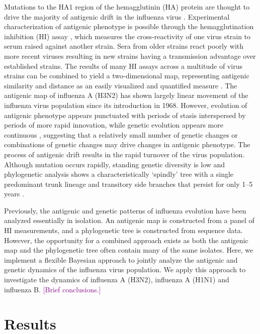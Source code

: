 \documentclass[11pt,oneside,letterpaper]{article}
\def\tbc#1{\textcolor{purple}{[#1]}}
\begin{document}
Mutations to the HA1 region of the hemagglutinin (HA) protein are thought to drive the majority of antigenic drift in the influenza virus \cite{Nelson07NatRevGenet}. 
Experimental characterization of antigenic phenotype is possible through the hemagglutination inhibition (HI) assay \cite{Hirst43}, which measures the cross-reactivity of one virus strain to serum raised against another strain. 
Sera from older strains react poorly with more recent viruses resulting in new strains having a transmission advantage over established strains. 
The results of many HI assays across a multitude of virus strains can be combined to yield a two-dimensional map, representing antigenic similarity and distance as an easily visualized and quantified measure \cite{Smith04}. 
The antigenic map of influenza A (H3N2) has shown largely linear movement of the influenza virus population since its introduction in 1968. However, evolution of antigenic phenotype appears punctuated with periods of stasis interspersed by periods of more rapid innovation, while genetic evolution appears more continuous \cite{Smith04}, suggesting that a relatively small number of genetic changes or combinations of genetic changes may drive changes in antigenic phenotype. 
The process of antigenic drift results in the rapid turnover of the virus population. 
Although mutation occurs rapidly, standing genetic diversity is low and phylogenetic analysis shows a characteristically `spindly' tree with a single predominant trunk lineage and transitory side branches that persist for only 1--5 years \cite{Fitch97}.

Previously, the antigenic and genetic patterns of influenza evolution have been analyzed essentially in isolation. 
An antigenic map is constructed from a panel of HI measurements, and a phylogenetic tree is constructed from sequence data. 
However, the opportunity for a combined approach exists as both the antigenic map and the phylogenetic tree often contain many of the same isolates. 
Here, we implement a flexible Bayesian approach to jointly analyze the antigenic and genetic dynamics of the influenza virus population. 
We apply this approach to investigate the dynamics of influenza A (H3N2), influenza A (H1N1) and influenza B. 
\tbc{Brief conclusions.}

\section*{Results}

\end{document}
